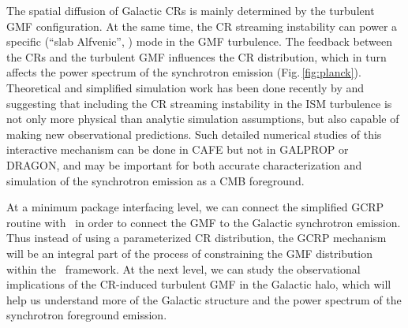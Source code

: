 
The spatial diffusion of Galactic CRs is mainly determined by the turbulent GMF configuration. 
At the same time, the CR streaming instability can power a specific (``slab Alfvenic'', \citealt{Lazarian2006}) mode in the GMF turbulence.
The feedback between the CRs and the turbulent GMF influences the CR distribution, which in turn affects the power spectrum of the synchrotron emission (Fig.\,\ref{fig:planck}).
Theoretical and simplified simulation work has been done recently by \cite{Blasi2012} and \cite{Evoli2018} suggesting that including the CR streaming instability in the ISM turbulence is not only more physical than analytic simulation assumptions, but also capable of making new observational predictions.  Such detailed numerical studies of this interactive mechanism can be done in CAFE but not in GALPROP or DRAGON, and may be important for both accurate characterization and simulation of the synchrotron emission as a CMB foreground. 

At a minimum package interfacing level, we can connect the simplified GCRP routine with \hammurabi\ in order to connect the GMF to the Galactic synchrotron emission.
Thus instead of using a parameterized CR distribution, the GCRP mechanism will be an integral part of the process of constraining the GMF distribution within the \imagine\ framework.  At the next level, we can study the observational implications of the CR-induced turbulent GMF in the Galactic halo, which will help us understand more of the Galactic structure and the power spectrum of the synchrotron foreground emission.


